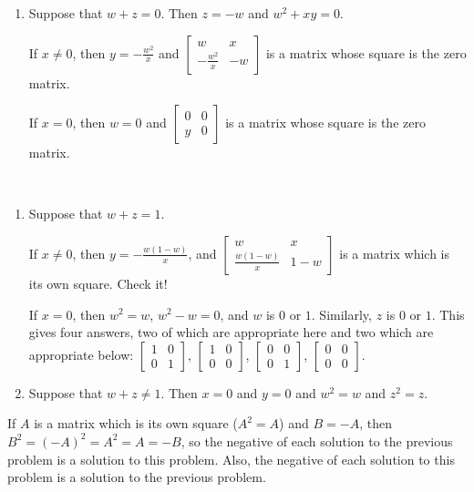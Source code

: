 \documentclass{article}
\begin{document}
\begin{description}
\begin{enumerate}[\hspace{1cm}(I)]
      \item Suppose that $w+z = 0$. Then $z = -w$ and $w^2 + xy = 0$.

        If $x \neq 0$, then $y = -\frac{w^2}{x}$ and $\begin{bmatrix} w & x \\ -\frac{w^2}{x} & -w \end{bmatrix}$ is a matrix whose square is the zero matrix.

        If $x=0$, then $w=0$ and $\begin{bmatrix} 0 & 0 \\ y & 0 \end{bmatrix}$ is a matrix whose square is the zero matrix. 
    \end{enumerate}

  \item[71.] $\ $
    \begin{enumerate}[\hspace{1cm}(I)]
      \item Suppose that $w+z = 1$.

        If $x \neq 0$, then $y = -\frac{w(1-w)}{x}$, and $\begin{bmatrix} w & x \\ \frac{w(1-w)}{x} & 1-w \end{bmatrix}$ is a matrix which is its own square. Check it!

        If $x=0$, then $w^2 = w$, $w^2-w = 0$, and $w$ is $0$ or $1$. Similarly, $z$ is $0$ or $1$. This gives four answers, two of which are appropriate here and two which are appropriate below:
        $\begin{bmatrix} 1 & 0 \\ 0 & 1 \end{bmatrix}$, $\begin{bmatrix} 1 & 0 \\ 0 & 0 \end{bmatrix}$, $\begin{bmatrix} 0 & 0 \\ 0 & 1 \end{bmatrix}$, $\begin{bmatrix} 0 & 0 \\ 0 & 0 \end{bmatrix}$.

      \item Suppose that $w+z \neq 1$. Then $x=0$ and $y=0$ and $w^2 = w$ and $z^2 = z$.
    \end{enumerate}

  \item[72.] If $A$ is a matrix which is its own square ($A^2=A$) and $B=-A$, then $B^2 = (-A)^2 = A^2 = A = -B$, so the negative of each solution to the previous problem is a solution to this problem. Also, the negative of each solution to this problem is a solution to the previous problem.


\end{description}
\end{document}

